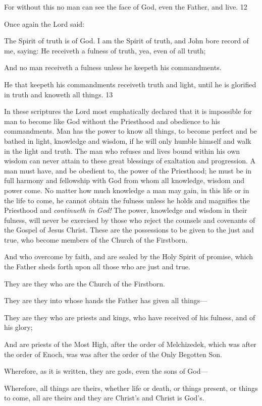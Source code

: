 For without this no man can see the face of God, even the Father, and live. 12

Once again the Lord said:

The Spirit of truth is of God. I am the Spirit of truth, and John bore record of me, saying: He
receiveth a fulness of truth, yea, even of all truth;

And no man receiveth a fulness unless he keepeth his commandments.

He that keepeth his commandments receiveth truth and light, until he is glorified in truth and
knoweth all things. 13

In these scriptures the Lord most emphatically declared that it is impossible for man to
become like God without the Priesthood and obedience to his commandments. Man has the
power to know all things, to become perfect and be bathed in light, knowledge and wisdom,
if he will only humble himself and walk in the light and truth. The man who refuses and lives
bound within his own wisdom can never attain to these great blessings of exaltation and
progression. A man must have, and be obedient to, the power of the Priesthood; he must be in
full harmony and fellowship with God from whom all knowledge, wisdom and power come.
No matter how much knowledge a man may gain, in this life or in the life to come, he cannot
obtain the fulness unless he holds and magnifies the Priesthood and \textit{continueth in God!} The
power, knowledge and wisdom in their fulness, will never be exercised by those who reject
the counsels and covenants of the Gospel of Jesus Christ. These are the possessions to be
given to the just and true, who become members of the Church of the Firstborn.

And who overcome by faith, and are sealed by the Holy Spirit of promise, which the Father
sheds forth upon all those who are just and true.

They are they who are the Church of the Firstborn.

They are they into whose hands the Father has given all things—

They are they who are priests and kings, who have received of his fulness, and of his glory;

And are priests of the Most High, after the order of Melchizedek, which was after the order
of Enoch, was was after the order of the Only Begotten Son.

Wherefore, as it is written, they are gods, even the sons of God—

Wherefore, all things are theirs, whether life or death, or things present, or things to come, all
are theirs and they are Christ's and Christ is God's.

